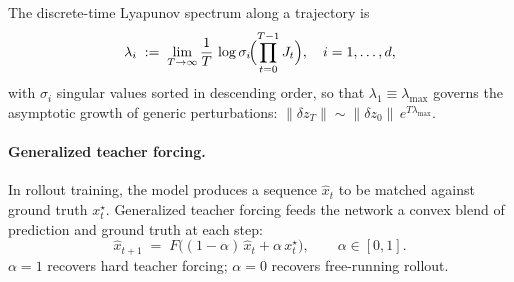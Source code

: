 The discrete-time Lyapunov spectrum along a trajectory is
%
\begin{equation}
  \lambda_i \;:=\; \lim_{T \to \infty}
  \frac{1}{T}\,\log\sigma_i\!\Bigl(\prod_{t=0}^{T-1} J_t\Bigr),
  \quad i=1,\dots,d,
  \label{eq:lyap-spec}
\end{equation}
%
with $\sigma_i$ singular values sorted in descending order, so that
$\lambda_1 \equiv \lambda_{\max}$ governs the asymptotic growth of
generic perturbations: $\|\delta z_T\| \sim \|\delta z_0\|\,e^{T\lambda_{\max}}$.

\paragraph{Generalized teacher forcing.}
In rollout training, the model produces a sequence $\hat{x}_t$ to be
matched against ground truth $x_t^\star$. Generalized teacher forcing
\citep{HessEtAl2023} feeds the network a convex blend of prediction
and ground truth at each step:
%
\begin{equation}
  \hat{x}_{t+1} \;=\; F\!\bigl((1-\alpha)\,\hat{x}_t + \alpha\, x_t^\star\bigr),
  \qquad \alpha \in [0,1].
  \label{eq:gtf}
\end{equation}
%
$\alpha = 1$ recovers hard teacher forcing; $\alpha = 0$ recovers
free-running rollout.


